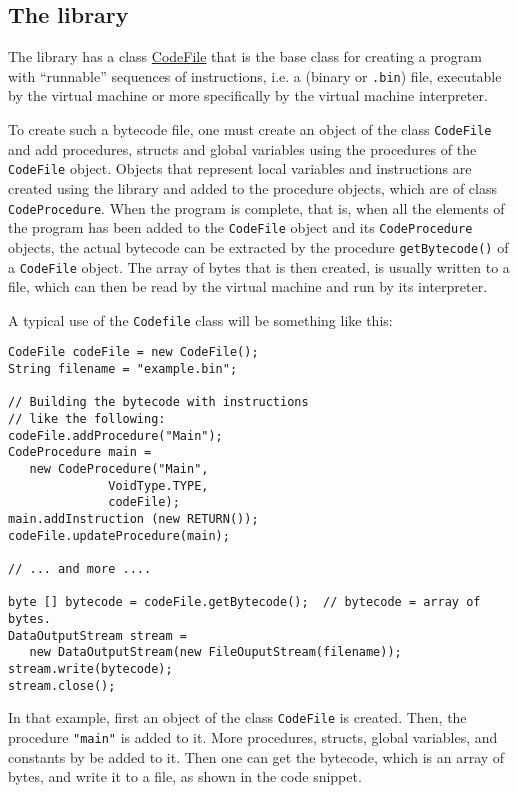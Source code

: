 \documentclass[11pt]{article}
\begin{document}
\subsection{The library}
\label{sec:org07be295}

The library has a class \href{../../../material/oblig2-patch/src/bytecode/CodeFile.java}{CodeFile} that is the base class for creating a
program with ``runnable'' sequences of instructions, i.e. a (binary or
\texttt{.bin}) file, executable by the virtual machine or more specifically by the
virtual machine interpreter.


To create such a bytecode file, one must create an object of the class
\texttt{CodeFile} and add procedures, structs and global variables using the
procedures of the \texttt{CodeFile} object. Objects that represent local variables
and instructions are created using the library and added to the procedure
objects, which are of class \texttt{CodeProcedure}. When the program is complete,
that is, when all the elements of the program has been added to the
\texttt{CodeFile} object and its \texttt{CodeProcedure} objects, the actual bytecode can
be extracted by the procedure \texttt{getBytecode()} of a \texttt{CodeFile} object.  The
array of bytes that is then created, is usually written to a file, which
can then be read by the virtual machine and run by its interpreter.



A typical use of the \texttt{Codefile} class will be something like this:



\lstset{language=java,label= ,caption= ,captionpos=b,numbers=none}
\begin{lstlisting}
CodeFile codeFile = new CodeFile();
String filename = "example.bin";

// Building the bytecode with instructions 
// like the following:
codeFile.addProcedure("Main");
CodeProcedure main = 
   new CodeProcedure("Main",
		      VoidType.TYPE,
		      codeFile);
main.addInstruction (new RETURN());
codeFile.updateProcedure(main);

// ... and more ....

byte [] bytecode = codeFile.getBytecode();  // bytecode = array of bytes.
DataOutputStream stream = 
   new DataOutputStream(new FileOuputStream(filename));
stream.write(bytecode);
stream.close();
\end{lstlisting}

In that example, first an object of the class \texttt{CodeFile} is created. Then,
the procedure \texttt{"main"} is added to it. More procedures, structs, global
variables, and constants by be added to it. Then one can get the bytecode,
which is an array of bytes, and write it to a file, as shown in the code
snippet.
\end{document}
